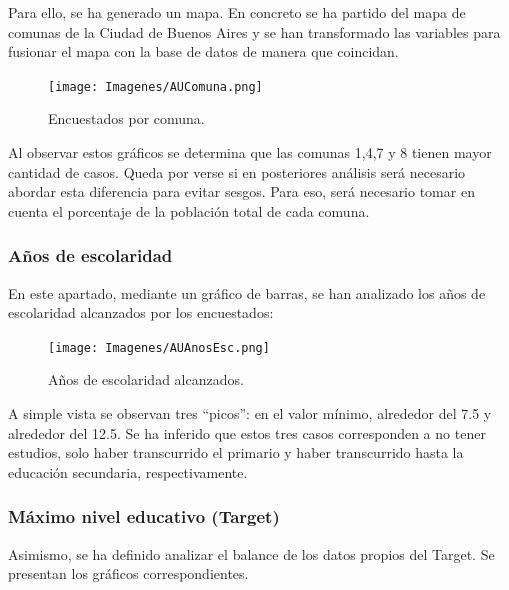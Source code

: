 \documentclass[a4paper]{article}
\begin{document}
            Para ello, se ha generado un mapa. En concreto se ha partido del mapa de comunas de la Ciudad de Buenos Aires y se han transformado las variables para fusionar el mapa con la base de datos de manera que coincidan.
           
            \begin{figure}  [H]
                \centering
                \texttt{[image: Imagenes/AUComuna.png]}  
                \caption{Encuestados por comuna.}
                \label{AU comuna}
            \end{figure}
 
            Al observar estos gráficos se determina que las comunas 1,4,7 y 8 tienen mayor cantidad de casos. Queda por verse si en posteriores análisis será necesario abordar esta diferencia para evitar sesgos. Para eso, será necesario tomar en cuenta el porcentaje de la población total de cada comuna.
           

            \subsubsection{Años de escolaridad}
           
            En este apartado, mediante un gráfico de barras, se han analizado los años de escolaridad alcanzados por los encuestados:
           
            \begin{figure}[H]
                \centering
                \texttt{[image: Imagenes/AUAnosEsc.png]}
                \caption{Años de escolaridad alcanzados.}
                \label{AU years of scholarship}
            \end{figure}
           
            A simple vista se observan tres ``picos'': en el valor mínimo, alrededor del 7.5 y alrededor del 12.5. Se ha inferido que estos tres casos corresponden a no tener estudios, solo haber transcurrido el primario y haber transcurrido hasta la educación secundaria, respectivamente.
           
            \subsubsection{Máximo nivel educativo (Target)}
            
            Asimismo, se ha definido analizar el balance de los datos propios del Target. Se presentan los gráficos correspondientes.
            
\end{document}
